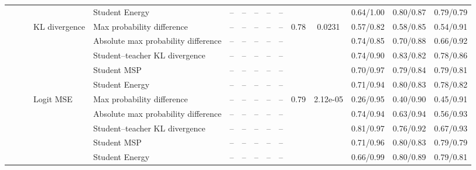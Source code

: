 \documentclass[border=2pt]{standalone}
\begin{document}
\begin{tabular}{lllllcccccccccc}
 &  &  &  & Student Energy & -- & -- & -- & -- & -- &  &  & 0.64/1.00 & 0.80/0.87 & 0.79/0.79 \\
 &  &  & KL divergence & Max probability difference & -- & -- & -- & -- & -- & 0.78 & 0.0231 & 0.57/0.82 & 0.58/0.85 & 0.54/0.91 \\
 &  &  &  & Absolute max probability difference & -- & -- & -- & -- & -- &  &  & 0.74/0.85 & 0.70/0.88 & 0.66/0.92 \\
 &  &  &  & Student--teacher KL divergence & -- & -- & -- & -- & -- &  &  & 0.74/0.90 & 0.83/0.82 & 0.78/0.86 \\
 &  &  &  & Student MSP & -- & -- & -- & -- & -- &  &  & 0.70/0.97 & 0.79/0.84 & 0.79/0.81 \\
 &  &  &  & Student Energy & -- & -- & -- & -- & -- &  &  & 0.71/0.94 & 0.80/0.83 & 0.78/0.82 \\
 &  &  & Logit MSE & Max probability difference & -- & -- & -- & -- & -- & 0.79 & 2.12e-05 & 0.26/0.95 & 0.40/0.90 & 0.45/0.91 \\
 &  &  &  & Absolute max probability difference & -- & -- & -- & -- & -- &  &  & 0.74/0.94 & 0.63/0.94 & 0.56/0.93 \\
 &  &  &  & Student--teacher KL divergence & -- & -- & -- & -- & -- &  &  & 0.81/0.97 & 0.76/0.92 & 0.67/0.93 \\
 &  &  &  & Student MSP & -- & -- & -- & -- & -- &  &  & 0.71/0.96 & 0.80/0.83 & 0.79/0.79 \\
 &  &  &  & Student Energy & -- & -- & -- & -- & -- &  &  & 0.66/0.99 & 0.80/0.89 & 0.79/0.81 \\
\bottomrule
\end{tabular}
\end{document}
